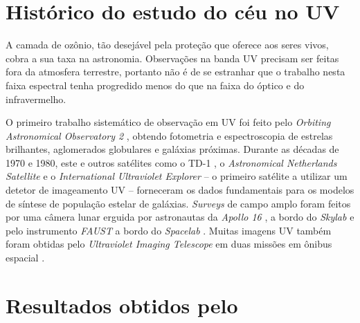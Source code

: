 
\section{Histórico do estudo do céu no UV}
\label{sec:Galex:CeuUV}

A camada de ozônio, tão desejável pela proteção que oferece aos seres vivos,
cobra a sua taxa na astronomia. Observações na banda UV precisam ser feitas fora
da atmosfera terrestre, portanto não é de se estranhar que o trabalho nesta
faixa espectral tenha progredido menos do que na faixa do óptico e do
infravermelho.\citneed

O primeiro trabalho sistemático de observação em UV foi feito pelo {\em Orbiting
Astronomical Observatory 2} \citep{Code1970}, obtendo fotometria e
espectroscopia de estrelas brilhantes, aglomerados globulares e galáxias
próximas. Durante as décadas de 1970 e 1980, este e outros satélites como o TD-1
\citep{Boksenberg1973}, o {\em Astronomical Netherlands Satellite}
\citep{vanDuinen1975} e o {\em International Ultraviolet Explorer}
\citep{Kondo1987} -- o primeiro satélite a utilizar um detetor de imageamento UV
-- forneceram os dados fundamentais para os modelos de síntese de população
estelar de galáxias. {\em Surveys} de campo amplo foram feitos por uma câmera
lunar erguida por astronautas da {\em Apollo 16} \citep{Carruthers1973}, a bordo
do {\em Skylab} \citep{Henize1975} e pelo instrumento {\em FAUST} a bordo do
{\em Spacelab} \citep{Bowyer1993}. Muitas imagens UV também foram obtidas pelo
{\em Ultraviolet Imaging Telescope} em duas missões em ônibus espacial
\citep{Stecher1997}.



\section{Resultados obtidos pelo \galex}
\label{sec:Galex:Resultados}

